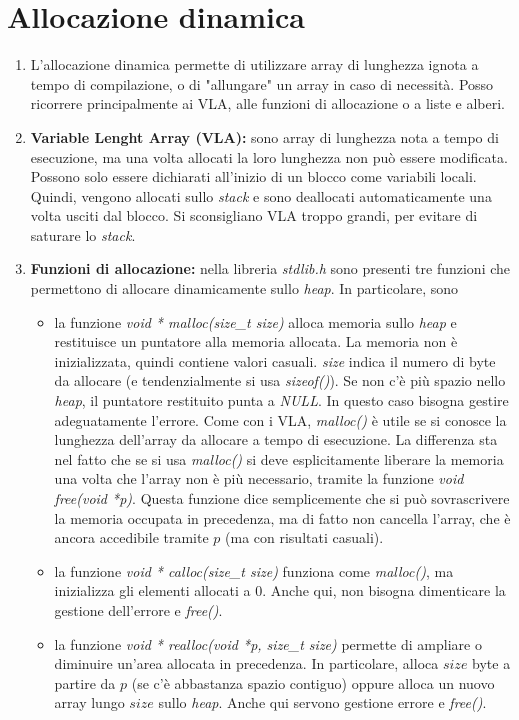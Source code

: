 \documentclass[a4paper,11pt]{article}
\begin{document}
\section{Allocazione dinamica}
\begin{enumerate}[resume]
	\item L'allocazione dinamica permette di utilizzare array di lunghezza ignota a tempo di compilazione, o di "allungare" un array in caso di necessità. Posso ricorrere principalmente ai VLA, alle funzioni di allocazione o a liste e alberi.
	\item \textbf{Variable Lenght Array (VLA):} sono array di lunghezza nota a tempo di esecuzione, ma una volta allocati la loro lunghezza non può essere modificata. Possono solo essere dichiarati all'inizio di un blocco come variabili locali. Quindi, vengono allocati sullo \textit{stack} e sono deallocati automaticamente una volta usciti dal blocco. Si sconsigliano VLA troppo grandi, per evitare di saturare lo \textit{stack}. 
	\item\textbf{Funzioni di allocazione:} nella libreria \textit{stdlib.h} sono presenti tre funzioni che permettono di allocare dinamicamente sullo \textit{heap}. In particolare, sono
	\begin{itemize}
		\item la funzione \textit{void * malloc(size\_t size)} alloca memoria sullo \textit{heap} e restituisce un puntatore alla memoria allocata. La memoria non è inizializzata, quindi contiene valori casuali. \textit{size} indica il numero di byte da allocare (e tendenzialmente si usa \textit{sizeof()}). Se non c'è più spazio nello \textit{heap}, il puntatore restituito punta a \textit{NULL}. In questo caso bisogna gestire adeguatamente l'errore. Come con i VLA, \textit{malloc()} è utile se si conosce la lunghezza dell'array da allocare a tempo di esecuzione. La differenza sta nel fatto che se si usa \textit{malloc()} si deve esplicitamente liberare la memoria una volta che l'array non è più necessario, tramite la funzione \textit{void free(void *p)}. Questa funzione dice semplicemente che si può sovrascrivere la memoria occupata in precedenza, ma di fatto non cancella l'array, che è ancora accedibile tramite $p$ (ma con risultati casuali).
		\item la funzione \textit{void * calloc(size\_t size)} funziona come \textit{malloc()}, ma inizializza gli elementi allocati a 0. Anche qui, non bisogna dimenticare la gestione dell'errore e \textit{free()}.
		\item la funzione \textit{void * realloc(void *p, size\_t size)} permette di ampliare o diminuire un'area allocata in precedenza. In particolare, alloca $size$ byte a partire da $p$ (se c'è abbastanza spazio contiguo) oppure alloca un nuovo array lungo $size$ sullo \textit{heap}. Anche qui servono gestione errore e \textit{free()}.

\end{itemize}
\end{enumerate}
\end{document}

